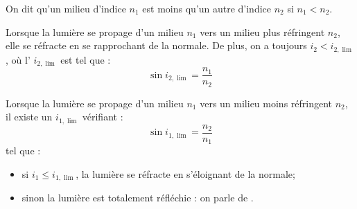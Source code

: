 \begin{definition}
On dit qu'un milieu d'indice $n_1$ est moins  qu'un autre d'indice $n_2$ si $n_1 < n_2$.
\end{definition}

\begin{propriete}
Lorsque la lumière se propage d'un milieu $n_1$ vers un milieu plus réfringent $n_2$, elle se réfracte en se rapprochant de la normale. De plus, on a toujours $i_2 < i_{2, \lim}$, où l' $i_{2, \lim}$ est tel que :
\[\sin i_{2, \lim} = \frac{n_1}{n_2}\]
\end{propriete}

\begin{propriete}
Lorsque la lumière se propage d'un milieu $n_1$ vers un milieu moins réfringent $n_2$, il existe un  $i_{1, \lim}$ vérifiant :
\[\sin i_{1, \lim} = \frac{n_2}{n_1}\]
tel que :

\begin{itemize}
\item si $i_1 \leq i_{1, \lim}$, la lumière se réfracte en s'éloignant de la normale;

\item sinon la lumière est totalement réfléchie : on parle de .
\end{itemize}
\end{propriete}